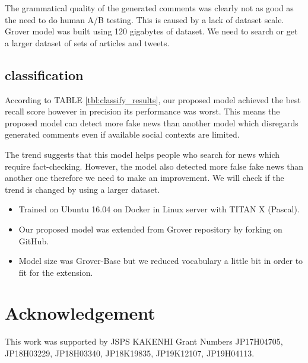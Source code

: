 \documentclass[conference]{IEEEtran}
\begin{document}
The grammatical quality of the generated comments was clearly not as good as the need to do human A/B testing.
This is caused by a lack of dataset scale. 
Grover model was built using 120 gigabytes of dataset\cite{NIPS2019_9106}.
We need to search or get a larger dataset of sets of articles and tweets.

\subsection{classification}
According to TABLE \ref{tbl:classify_results}, our proposed model achieved the best recall score however in precision its performance was worst.
This means the proposed model can detect more fake news than another model which disregards generated comments even if available social contexts are limited. 

The trend suggests that this model helps people who search for news which require fact-checking. 
However, the model also detected more false fake news than another one therefore we need to make an improvement.
We will check if the trend is changed by using a larger dataset.

\label{app:settings}
\begin{itemize}[]
    \item Trained on Ubuntu 16.04 on Docker in Linux server with TITAN X (Pascal).
    \item Our proposed model was extended from Grover repository by forking on GitHub.
    \item Model size was Grover-Base but we reduced vocabulary a little bit in order to fit for the extension.
\end{itemize}

\section*{Acknowledgement}
This work was supported by JSPS KAKENHI Grant Numbers JP17H04705, JP18H03229, JP18H03340, JP18K19835, JP19K12107, JP19H04113.



\end{document}
